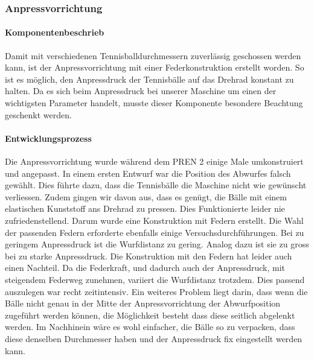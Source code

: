 \subsubsection{Anpressvorrichtung}

\paragraph{Komponentenbeschrieb}
Damit mit verschiedenen Tennisballdurchmessern zuverlässig geschossen werden kann, ist der Anpressvorrichtung mit einer Federkonstruktion erstellt worden. So ist es möglich, den Anpressdruck der Tennisbälle auf das Drehrad konstant zu halten. Da es sich beim Anpressdruck bei unserer Maschine um einen der wichtigsten Parameter handelt, musste dieser Komponente besondere Beachtung geschenkt werden. 

\paragraph{Entwicklungsprozess}
Die Anpressvorrichtung wurde während dem PREN 2 einige Male umkonstruiert und angepasst. In einem ersten Entwurf war die Position des Abwurfes falsch gewählt. Dies führte dazu, dass die Tennisbälle die Maschine nicht wie gewünscht verliessen. Zudem gingen wir davon aus, dass es genügt, die Bälle mit einem elastischen Kunststoff ans Drehrad zu pressen. Dies Funktionierte leider nie zufriedenstellend. Darum wurde eine Konstruktion mit Federn erstellt. Die Wahl der passenden Federn erforderte ebenfalls einige Versuchsdurchführungen. Bei zu geringem Anpressdruck ist die Wurfdistanz zu gering. Analog dazu ist sie zu gross bei zu starke Anpressdruck. Die Konstruktion mit den Federn hat leider auch einen Nachteil. Da die Federkraft, und dadurch auch der Anpressdruck, mit steigendem Federweg zunehmen, variiert die Wurfdistanz trotzdem. Dies passend auszulegen war recht zeitintensiv. Ein weiteres Problem liegt darin, dass wenn die Bälle nicht genau in der Mitte der Anpressvorrichtung der Abwurfposition zugeführt werden können, die Möglichkeit besteht dass diese seitlich abgelenkt werden. Im Nachhinein wäre es wohl einfacher, die Bälle so zu verpacken, dass diese denselben Durchmesser haben und der Anpressdruck fix eingestellt werden kann.